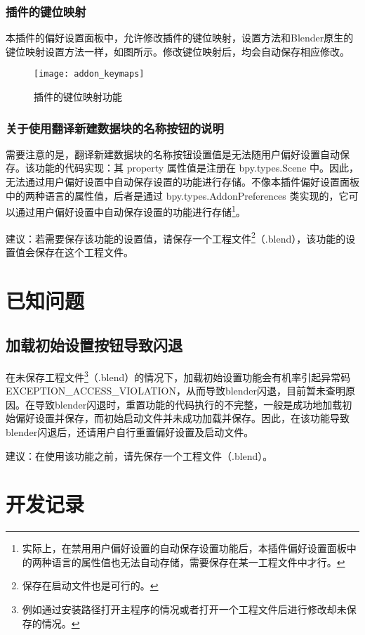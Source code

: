 \documentclass{../../public_resources/doc}
\begin{document}
\subsection{插件的键位映射}
\label{插件的键位映射}
本插件的偏好设置面板中，允许修改插件的键位映射，设置方法和Blender原生的键位映射设置方法一样，如图所示。修改键位映射后，均会自动保存相应修改。

\begin{figure}[h!]
    \texttt{[image: addon\_keymaps]}
    \caption{插件的键位映射功能}
    \label{插件的键位映射功能}
\end{figure}

\subsection{关于使用翻译新建数据块的名称按钮的说明}
需要注意的是，翻译新建数据块的名称按钮设置值是无法随用户偏好设置自动保存。该功能的代码实现：其 property 属性值是注册在 bpy.types.Scene 中。因此，无法通过用户偏好设置中自动保存设置的功能进行存储。不像本插件偏好设置面板中的两种语言的属性值，后者是通过 bpy.types.AddonPreferences 类实现的，它可以通过用户偏好设置中自动保存设置的功能进行存储\footnote{实际上，在禁用用户偏好设置的自动保存设置功能后，本插件偏好设置面板中的两种语言的属性值也无法自动存储，需要保存在某一工程文件中才行。}。

建议：若需要保存该功能的设置值，请保存一个工程文件\footnote{保存在启动文件也是可行的。}（.blend），该功能的设置值会保存在这个工程文件。

\chapter{已知问题}
\section{加载初始设置按钮导致闪退}
在未保存工程文件\footnote{例如通过安装路径打开主程序的情况或者打开一个工程文件后进行修改却未保存的情况。}（.blend）的情况下，加载初始设置功能会有机率引起异常码EXCEPTION\_ACCESS\_VIOLATION，从而导致blender闪退，目前暂未查明原因。在导致blender闪退时，重置功能的代码执行的不完整，一般是成功地加载初始偏好设置并保存，而初始启动文件并未成功加载并保存。因此，在该功能导致blender闪退后，还请用户自行重置偏好设置及启动文件。

建议：在使用该功能之前，请先保存一个工程文件（.blend）。

\chapter{开发记录}
\end{document}
